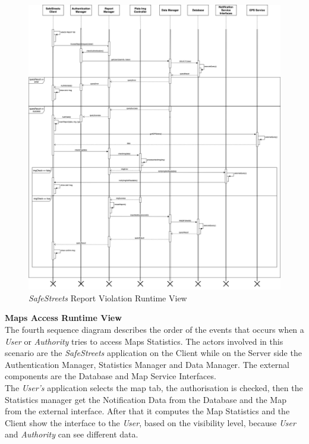 \documentclass{article}
\begin{document}
	\begin{figure}[H]
			\centering
			\includegraphics[scale=0.22]{Images/Diagrams/Runtime/report_runtime.png}
			\caption{{\it SafeStreets} Report Violation Runtime View}
	\end{figure}
	\pagebreak
	\noindent
	{\bf Maps Access Runtime View} \\
	The fourth sequence diagram describes the order of the events that occurs when a {\it User} or {\it Authority} tries to access Maps Statistics. The actors involved in this scenario are the {\it SafeStreets} application on the Client while on the Server side the Authentication Manager, Statistics Manager and Data Manager. The external components are the Database and Map Service Interfaces. \\ 
	The {\it User's} application selects the map tab, the authorisation is checked, then the Statistics manager get the Notification Data from the Database and the Map from the external interface. After that it computes the Map Statistics and the Client show the interface to the {\it User}, based on the visibility level, because {\it User} and {\it Authority} can see different data.
\end{document}

